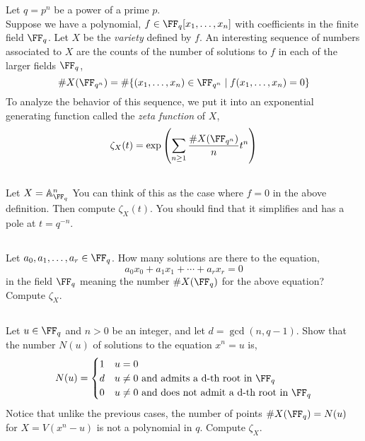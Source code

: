 \documentclass[12pt]{article}
\begin{document}
Let $q = p^n$ be a power of a prime $p$. 
\\
Suppose we have a polynomial, $f \in \FF_q[x_1, \dots, x_n]$ with coefficients in the finite field $\FF_q$. Let $X$ be the \textit{variety} defined by $f$. An interesting sequence of numbers associated to $X$ are the counts of the number of solutions to $f$ in each of the larger fields $\FF_q$,
\[ \# X(\FF_{q^n}) = \# \{ (x_1, \dots, x_n) \in \FF_{q^n} \mid f(x_1, \dots, x_n) = 0 \} \]
To analyze the behavior of this sequence, we put it into an exponential generating function called the \textit{zeta function} of $X$,
\[ \zeta_X(t) = \exp{ \left( \sum_{n \ge 1} \frac{\# X(\FF_{q^n})}{n} t^n \right)} \]

\subsection{}

Let $X = \A^n_{\FF_q}$ You can think of this as the case where $f = 0$ in the above definition. Then compute $\zeta_X(t)$. You should find that it simplifies and has a pole at $t = q^{-n}$.


\subsection{}

Let $a_0, a_1, \dots, a_r \in \FF_q$. How many solutions are there to the equation,
\[ a_0 x_0 + a_1 x_1 + \cdots + a_r x_r = 0 \]
in the field $\FF_q$ meaning the number $\# X(\FF_q)$ for the above equation? Compute $\zeta_X$.

\subsection{} \label{problem:roots}

Let $u \in \FF_q$ and $n > 0$ be an integer, and let $d = \gcd(n, q-1)$. Show that the number $N(u)$ of solutions to the equation $x^n = u$ is,
\[ N(u) = \begin{cases}
1 & u = 0
\\
d & u \neq 0 \text{ and admits a d-th root in } \FF_q
\\
0 & u \neq 0 \text{ and does not admit a d-th root in } \FF_q
\end{cases} \]
Notice that unlike the previous cases, the number of points $\# X(\FF_q) = N(u)$ for $X = V(x^n - u)$ is not a polynomial in $q$. Compute $\zeta_X$.


\subsection{} \label{hyperelliptic}
\end{document}
